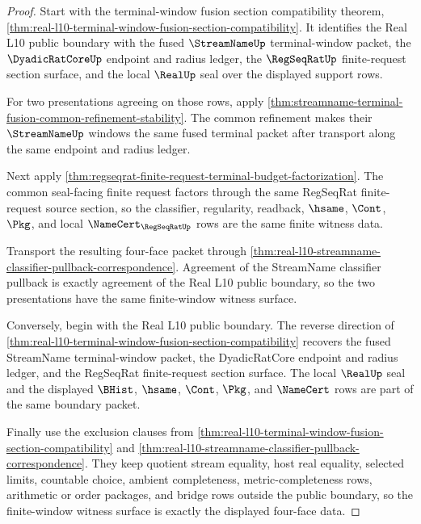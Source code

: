 \begin{proof}
Start with the terminal-window fusion section compatibility theorem, \autoref{thm:real-l10-terminal-window-fusion-section-compatibility}. It identifies the Real L10 public boundary with the fused $\StreamNameUp$ terminal-window packet, the $\DyadicRatCoreUp$ endpoint and radius ledger, the $\RegSeqRatUp$ finite-request section surface, and the local $\RealUp$ seal over the displayed support rows.

For two presentations agreeing on those rows, apply \autoref{thm:streamname-terminal-fusion-common-refinement-stability}. The common refinement makes their $\StreamNameUp$ windows the same fused terminal packet after transport along the same endpoint and radius ledger.

Next apply \autoref{thm:regseqrat-finite-request-terminal-budget-factorization}. The common seal-facing finite request factors through the same RegSeqRat finite-request source section, so the classifier, regularity, readback, $\hsame$, $\Cont$, $\Pkg$, and local $\NameCert_{\RegSeqRatUp}$ rows are the same finite witness data.

Transport the resulting four-face packet through \autoref{thm:real-l10-streamname-classifier-pullback-correspondence}. Agreement of the StreamName classifier pullback is exactly agreement of the Real L10 public boundary, so the two presentations have the same finite-window witness surface.

Conversely, begin with the Real L10 public boundary. The reverse direction of \autoref{thm:real-l10-terminal-window-fusion-section-compatibility} recovers the fused StreamName terminal-window packet, the DyadicRatCore endpoint and radius ledger, and the RegSeqRat finite-request section surface. The local $\RealUp$ seal and the displayed $\BHist$, $\hsame$, $\Cont$, $\Pkg$, and $\NameCert$ rows are part of the same boundary packet.

Finally use the exclusion clauses from \autoref{thm:real-l10-terminal-window-fusion-section-compatibility} and \autoref{thm:real-l10-streamname-classifier-pullback-correspondence}. They keep quotient stream equality, host real equality, selected limits, countable choice, ambient completeness, metric-completeness rows, arithmetic or order packages, and bridge rows outside the public boundary, so the finite-window witness surface is exactly the displayed four-face data.
\end{proof}

